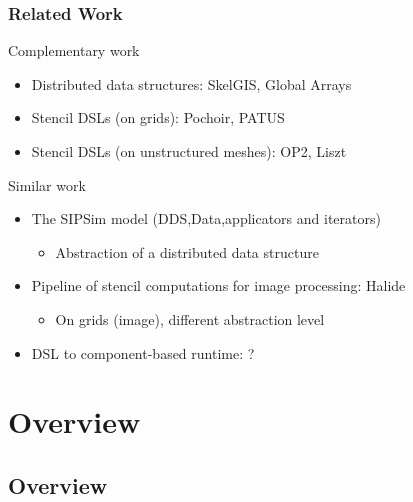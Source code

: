 \documentclass{beamer}
\begin{document}
\begin{frame}
\frametitle{Related Work}
\begin{block}{Complementary work}
\begin{itemize}
\item Distributed data structures: SkelGIS, Global Arrays
\item Stencil DSLs (on grids): Pochoir, PATUS
\item Stencil DSLs (on unstructured meshes): OP2, Liszt
\end{itemize}
\end{block}
\begin{alertblock}{Similar work}
\begin{itemize}
\item The SIPSim model (DDS,Data,applicators and iterators)
\begin{itemize}
\item Abstraction of a distributed data structure
\end{itemize}
\item Pipeline of stencil computations for image processing: Halide
\begin{itemize}
\item On grids (image), different abstraction level
\end{itemize}
\item DSL to component-based runtime: ?
\end{itemize}
\end{alertblock}
\end{frame}

\section{Overview}
\subsection{Overview}
\end{document}
